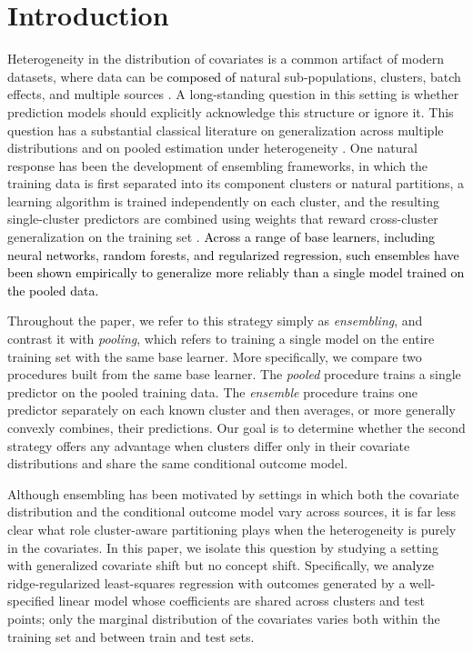 \documentclass{article}
\theoremstyle{plain}
\theoremstyle{remark}
\begin{document}
\section{Introduction}
\label{sec:intro}
\par Heterogeneity in the distribution of covariates is a common artifact of modern datasets, where data can be \textcolor{black}{composed of} natural sub-populations, clusters, batch effects, and multiple sources \citep{goh2017batch, chauhan2010data}. A long-standing question in this setting is whether prediction models should explicitly acknowledge this structure or ignore it. This question has a substantial classical literature on generalization across multiple distributions \citep{crammer2008learning, bendavid2010theory, mansour2009domain} and on pooled estimation under heterogeneity \citep{meinshausen2015maximin, li2022transfer}. One natural response has been the development of ensembling frameworks, in which the training data is first separated into its component clusters or natural partitions, a learning algorithm is trained independently on each cluster, and the resulting single-cluster predictors are combined using weights that reward cross-cluster generalization on the training set \citep{Patil2018, deodhar2007, Trivedi2015, Ramchandran2020, ramchandran2021ensembling,Guan2019a}. \textcolor{black}{Across a range of base learners, including neural networks, random forests, and regularized regression, such ensembles have been shown empirically to generalize more reliably than a single model trained on the pooled data.}

Throughout the paper, we refer to this strategy simply as \emph{ensembling}, and contrast it with \emph{pooling}, which refers to training a single model on the entire training set with the same base learner. More specifically, we compare two procedures built from the same base learner. The \emph{pooled} procedure trains a single predictor on the pooled training data. The \emph{ensemble} procedure trains one predictor separately on each known cluster and then averages, or more generally convexly combines, their predictions. Our goal is to determine whether the second strategy offers any advantage when clusters differ only in their covariate distributions and share the same conditional outcome model.

\par Although ensembling has been motivated by settings in which both the covariate distribution and the conditional outcome model vary across sources, it is far less clear what role cluster-aware partitioning plays when the heterogeneity is purely in the covariates. In this paper, we isolate this question by studying a setting with generalized covariate shift but no concept shift. Specifically, we \textcolor{black}{analyze} ridge-regularized least-squares regression with outcomes generated by a well-specified linear model whose coefficients are shared across clusters and test points; only the marginal distribution of the covariates varies both within the training set and between train and test sets.
\end{document}
